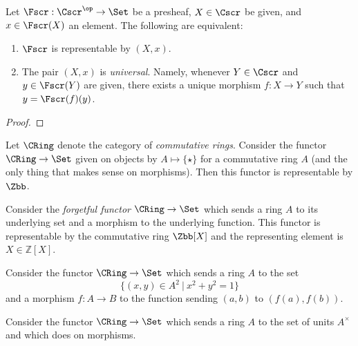 \begin{theorem}
  Let $\Fscr : \Cscr^{\op} \to \Set$ be a presheaf, $X \in \Cscr$ be given, and $x \in \Fscr(X)$ an element.
  The following are equivalent:
  \begin{enumerate}
    \item $\Fscr$ is representable by $(X,x)$.
    \item The pair $(X,x)$ is \emph{universal}.
          Namely, whenever $Y \in \Cscr$ and $y \in \Fscr(Y)$ are given, there exists a unique morphism $f : X \to Y$ such that $y = \Fscr(f)(y)$.
  \end{enumerate}
\end{theorem}
\begin{proof}
\end{proof}


\begin{example}
  Let $\CRing$ denote the category of \emph{commutative rings}.
  Consider the functor $\CRing \to \Set$ given on objects by $A \mapsto \{\star\}$ for a commutative ring $A$ (and the only thing that makes sense on morphisms).
  Then this functor is representable by $\Zbb$.
\end{example}

\begin{example}
  Consider the \emph{forgetful functor} $\CRing \to \Set$ which sends a ring $A$ to its underlying set and a morphism to the underlying function.
  This functor is representable by the commutative ring $\Zbb[X]$ and the representing element is $X \in \mathbb{Z}[X]$.
\end{example}

\begin{example}
  Consider the functor $\CRing \to \Set$ which sends a ring $A$ to the set
  \[ \{ (x,y) \in A^{2} \ | \ x^{2} + y^{2} = 1 \} \]
  and a morphism $f : A \to B$ to the function sending $(a,b)$ to $(f(a),f(b))$.
\end{example}

\begin{example}
  Consider the functor $\CRing \to \Set$ which sends a ring $A$ to the set of units $A^{\times}$ and which does  on morphisms.
\end{example}

